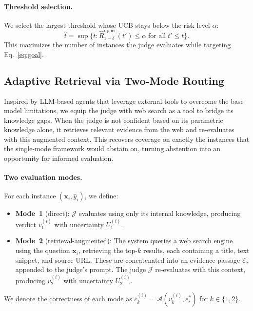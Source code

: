 \paragraph{Threshold selection.}
We select the largest threshold whose UCB stays below the risk level $\alpha$:
\begin{equation}
\label{eq:that_single}
  \hat{t} = \sup\big\{t : \hat{R}^{\mathrm{upper}}_{1-\delta}(t') \leq \alpha \;\text{for all}\; t' \leq t\big\}.
\end{equation}
This maximizes the number of instances the judge evaluates while targeting Eq.~\eqref{eq:goal}.

\subsection{Adaptive Retrieval via Two-Mode Routing}
\label{sec:routing}
Inspired by LLM-based agents that leverage external tools to overcome the base model limitations, we equip the judge with web search as a tool to bridge its knowledge gaps. When the judge is not confident based on its parametric knowledge alone, it retrieves relevant evidence from the web and re-evaluates with this augmented context. This recovers coverage on exactly the instances that the single-mode framework would abstain on, turning abstention into an opportunity for informed evaluation.

\paragraph{Two evaluation modes.}
For each instance $(\mathbf{x}_i, \hat{y}_i)$, we define:
\begin{itemize}
  \item \textbf{Mode~1} (direct): $\mathcal{J}$ evaluates using only its internal knowledge, producing verdict $v_1^{(i)}$ with uncertainty $U_1^{(i)}$.
  \item \textbf{Mode~2} (retrieval-augmented): The system queries a web search engine using the question $\mathbf{x}_i$, retrieving the top-$k$ results, each containing a title, text snippet, and source URL. These are concatenated into an evidence passage $\mathcal{E}_i$ appended to the judge's prompt. The judge $\mathcal{J}$ re-evaluates with this context, producing $v_2^{(i)}$ with uncertainty $U_2^{(i)}$.
\end{itemize}
We denote the correctness of each mode as $c_k^{(i)} = \mathcal{A}(v_k^{(i)}, e^*_i)$ for $k \in \{1, 2\}$.

